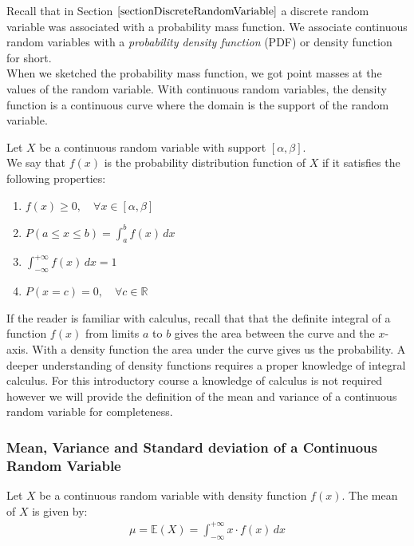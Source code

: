 Recall that in
Section $\ref{sectionDiscreteRandomVariable}$ a discrete random variable was associated with a probability mass function.
We associate continuous random variables with a \textit{probability density function} (PDF) or density function for short. \\

When we sketched the probability mass function, we got point masses at the values of the random variable. With continuous random variables, the density function is a continuous curve where the domain is the support of the random variable.


\begin{properties}
Let $X$ be a continuous random variable with support $[\alpha, \beta]$.\\	
We say that $f(x)$ is the probability distribution function of $X$ if it satisfies the following properties:\\
	\begin{enumerate}
	\item	$f(x) \geq 0,\quad \forall x \in [\alpha,\beta]$\\[0.5em]
	\item	$P(a \leq x \leq b) = \displaystyle\int_a^b f(x) \,dx$ \\[0.5em]
	\item $\displaystyle\int_{-\infty}^{+\infty} f(x) \,dx = 1 $\\[0.5em]
	\item	$P( x = c) = 0, \quad \forall c \in \mathbb{R}$
	\end{enumerate}
\end{properties}

If the reader is familiar with calculus, recall that that the definite integral of a function $f(x)$ from limits $a$ to $b$ gives the area between the curve and the $x$-axis.
With a density function the area under the curve gives us the probability.
A deeper understanding of density functions requires a proper knowledge of integral calculus.
For this introductory course a knowledge of calculus is not required however we will provide the definition of the mean and variance of a continuous random variable for completeness.

\subsubsection{Mean, Variance and Standard deviation of a Continuous Random Variable}


\begin{definition}
Let $X$ be a continuous random variable with density function $f(x)$. 
The mean of $X$ is given by:
\begin{align}
\mu = \mathbb{E}(X) = \displaystyle\int_{- \infty}^{+ \infty} x \cdot f(x) \, dx
\end{align}
\end{definition}


